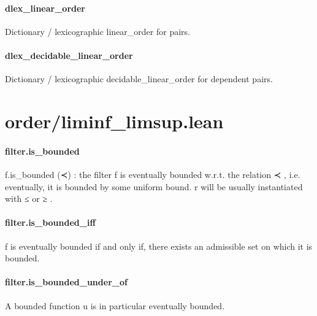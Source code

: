 \documentclass{article}
\begin{document}
\paragraph{dlex\_linear\_order}
\par
Dictionary / lexicographic linear\_order for pairs.
\paragraph{dlex\_decidable\_linear\_order}
\par
Dictionary / lexicographic decidable\_linear\_order for dependent pairs.
\section{order/liminf\_limsup.lean}\paragraph{filter.is\_bounded}
\par
\colorbox[RGB]{253,246,227}{{{{\color[RGB]{101, 123, 131} f.is\_bounded (≺) }}}}: the filter 
\colorbox[RGB]{253,246,227}{{{{\color[RGB]{101, 123, 131} f }}}} is eventually bounded w.r.t. the relation 
\colorbox[RGB]{253,246,227}{{{{\color[RGB]{101, 123, 131} ≺ }}}}, i.e.
eventually, it is bounded by some uniform bound.
\colorbox[RGB]{253,246,227}{{{{\color[RGB]{101, 123, 131} r }}}} will be usually instantiated with 
\colorbox[RGB]{253,246,227}{{{{\color[RGB]{181, 137, 0} ≤ }}}} or 
\colorbox[RGB]{253,246,227}{{{{\color[RGB]{181, 137, 0} ≥ }}}}.
\paragraph{filter.is\_bounded\_iff}
\par
\colorbox[RGB]{253,246,227}{{{{\color[RGB]{101, 123, 131} f }}}} is eventually bounded if and only if, there exists an admissible set on which it is
bounded.
\paragraph{filter.is\_bounded\_under\_of}
\par
A bounded function 
\colorbox[RGB]{253,246,227}{{{{\color[RGB]{101, 123, 131} u }}}} is in particular eventually bounded.
\end{document}
